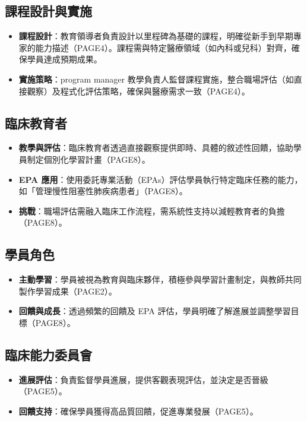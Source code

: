 \documentclass[12pt,a4paper]{article}
\begin{document}
\subsection{課程設計與實施}
\begin{itemize}[nosep]
    \item \textbf{課程設計}：教育領導者負責設計以里程碑為基礎的課程，明確從新手到早期專家的能力描述（PAGE4）。課程需與特定醫療領域（如內科或兒科）對齊，確保學員達成預期成果。
    \item \textbf{實施策略}：program manager 教學負責人監督課程實施，整合職場評估（如直接觀察）及程式化評估策略，確保與醫療需求一致（PAGE4）。
\end{itemize}

\subsection{臨床教育者}
\begin{itemize}[nosep]
    \item \textbf{教學與評估}：臨床教育者透過直接觀察提供即時、具體的敘述性回饋，協助學員制定個別化學習計畫（PAGE8）。
    \item \textbf{EPA 應用}：使用委託專業活動（EPAs）評估學員執行特定臨床任務的能力，如「管理慢性阻塞性肺疾病患者」（PAGE8）。
    \item \textbf{挑戰}：職場評估需融入臨床工作流程，需系統性支持以減輕教育者的負擔（PAGE8）。
\end{itemize}

\subsection{學員角色}
\begin{itemize}[nosep]
    \item \textbf{主動學習}：學員被視為教育與臨床夥伴，積極參與學習計畫制定，與教師共同製作學習成果（PAGE2）。
    \item \textbf{回饋與成長}：透過頻繁的回饋及 EPA 評估，學員明確了解進展並調整學習目標（PAGE8）。
\end{itemize}

\subsection{臨床能力委員會}
\begin{itemize}[nosep]
    \item \textbf{進展評估}：負責監督學員進展，提供客觀表現評估，並決定是否晉級（PAGE5）。
    \item \textbf{回饋支持}：確保學員獲得高品質回饋，促進專業發展（PAGE5）。
\end{itemize}
\end{document}
